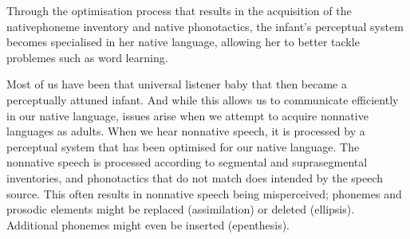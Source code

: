 Through the optimisation process that results in the acquisition of the nativephoneme inventory and native phonotactics, the infant's perceptual system becomes specialised in her native language, allowing her to better tackle problemes such as word learning.  

Most of us have been that universal listener baby that then became a perceptually attuned infant. And while this allows us to communicate efficiently in our native language, issues arise when we attempt to acquire nonnative languages as adults.
When we hear nonnative speech, it is processed by a perceptual system that has been optimised for our native language. The nonnative speech is processed according to segmental and suprasegmental inventories, and phonotactics that do not match does intended by the speech source.   
This often results in nonnative speech being misperceived; phonemes and prosodic elements might be replaced (assimilation) or deleted (ellipsis). Additional phonemes might even be inserted (epenthesis).

